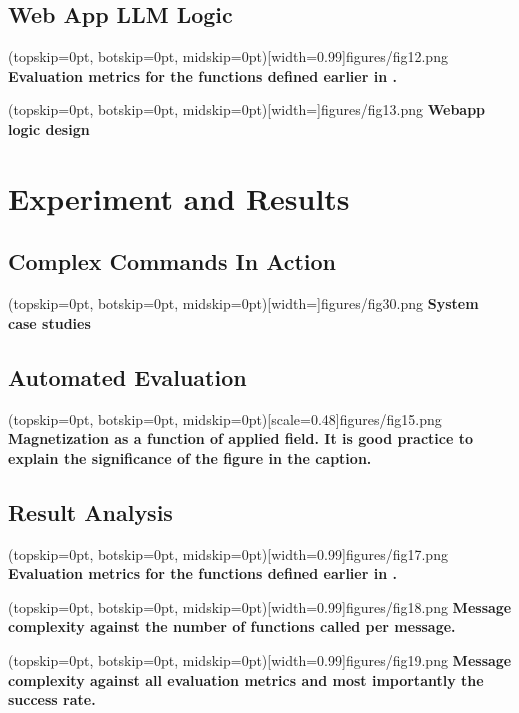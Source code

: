 \documentclass{ieeeaccess}
\begin{document}
\subsection{Web App LLM Logic}
\Figure[t!](topskip=0pt, botskip=0pt,
midskip=0pt)[width=0.99\columnwidth]{{figures/fig12.png}}
{ \textbf{Evaluation metrics for the functions defined earlier in .}\label{fig7}}

\Figure[t!](topskip=0pt, botskip=0pt,
midskip=0pt)[width=\textwidth]{{figures/fig13.png}}
{ \textbf{Webapp logic design}\label{fig5}}

\section{Experiment and Results}
\label{sec:experiment}

\subsection{Complex Commands In Action}
\Figure[t!](topskip=0pt, botskip=0pt,
midskip=0pt)[width=\textwidth]{{figures/fig30.png}}
{ \textbf{System case studies}\label{fig6}}


\subsection{Automated Evaluation}
\Figure[t!](topskip=0pt, botskip=0pt, midskip=0pt)[scale=0.48]{{figures/fig15.png}}
{ \textbf{Magnetization as a function of applied field.
It is good practice to explain the significance of the figure in the caption.}\label{fig6}}
\subsection{Result Analysis}

\Figure[t!](topskip=0pt, botskip=0pt,
midskip=0pt)[width=0.99\columnwidth]{{figures/fig17.png}}
{ \textbf{Evaluation metrics for the functions defined earlier in .}\label{fig7}}

\Figure[t!](topskip=0pt, botskip=0pt,
midskip=0pt)[width=0.99\columnwidth]{{figures/fig18.png}}
{ \textbf{Message complexity against the number of functions called per message.}\label{fig8}}

\Figure[t!](topskip=0pt, botskip=0pt,
midskip=0pt)[width=0.99\columnwidth]{{figures/fig19.png}}
{ \textbf{Message complexity against all evaluation metrics and most importantly the success rate.}\label{fig9}}
\end{document}
